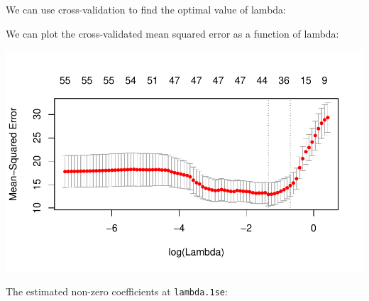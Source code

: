 We can use cross-validation to find the optimal value of lambda:



We can plot the cross-validated mean squared error as a function of lambda:

\begin{knitrout}\scriptsize
	\color{fgcolor}
	
	{\centering \includegraphics[width=1\linewidth]{figs/sail-plot-cv-design-1} 
		
	}
	
	
	
\end{knitrout}


The estimated non-zero coefficients at \texttt{lambda.1se}:

